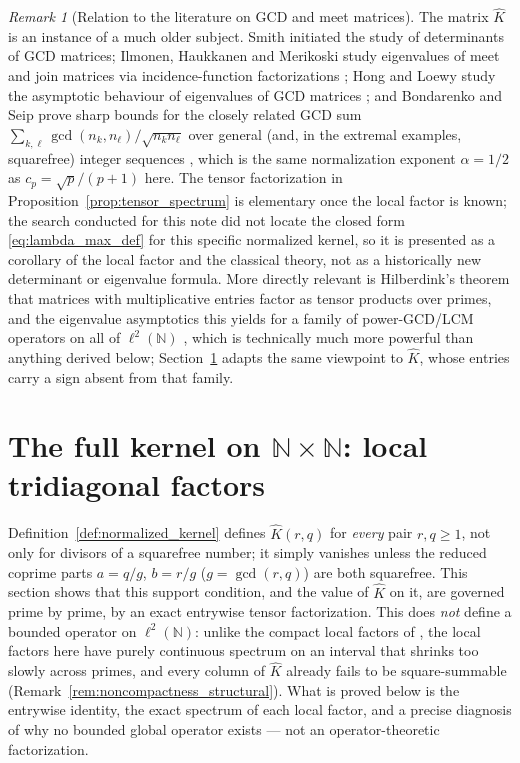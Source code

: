 \documentclass[11pt]{amsart}
\numberwithin{equation}{section}
\theoremstyle{plain}
\theoremstyle{definition}
\theoremstyle{remark}
\newtheorem{remark}[theorem]{Remark}
\newcommand{\N}{\mathbb N}
\begin{document}
\begin{remark}[Relation to the literature on GCD and meet matrices]
\label{rem:gcd_matrix_literature}
The matrix \(\widehat K\) is an instance of a much older subject.  Smith initiated the study of determinants of GCD matrices; Ilmonen, Haukkanen and Merikoski study eigenvalues of meet and join matrices via incidence-function factorizations \cite{IlmonenHaukkanenMerikoski2008}; Hong and Loewy study the asymptotic behaviour of eigenvalues of GCD matrices \cite{HongLoewy2004}; and Bondarenko and Seip prove sharp bounds for the closely related GCD sum \(\sum_{k,\ell}\gcd(n_k,n_\ell)/\sqrt{n_kn_\ell}\) over general (and, in the extremal examples, squarefree) integer sequences \cite{BondarenkoSeip2015}, which is the same normalization exponent \(\alpha=1/2\) as \(c_p=\sqrt p/(p+1)\) here.  The tensor factorization in Proposition~\ref{prop:tensor_spectrum} is elementary once the local factor is known; the search conducted for this note did not locate the closed form \eqref{eq:lambda_max_def} for this specific normalized kernel, so it is presented as a corollary of the local factor and the classical theory, not as a historically new determinant or eigenvalue formula.  More directly relevant is Hilberdink's theorem that matrices with multiplicative entries factor as tensor products over primes, and the eigenvalue asymptotics this yields for a family of power-GCD/LCM operators on all of \(\ell^2(\N)\) \cite{HilberdinkPushnitski2021}, which is technically much more powerful than anything derived below; Section~\ref{sec:full_tensor} adapts the same viewpoint to \(\widehat K\), whose entries carry a sign absent from that family.
\end{remark}

\section{The full kernel on \texorpdfstring{$\N\times\N$}{N x N}: local tridiagonal factors}
\label{sec:full_tensor}

Definition~\ref{def:normalized_kernel} defines \(\widehat K(r,q)\) for \emph{every} pair \(r,q\ge1\), not only for divisors of a squarefree number; it simply vanishes unless the reduced coprime parts \(a=q/g\), \(b=r/g\) (\(g=\gcd(r,q)\)) are both squarefree.  This section shows that this support condition, and the value of \(\widehat K\) on it, are governed prime by prime, by an exact entrywise tensor factorization.  This does \emph{not} define a bounded operator on \(\ell^2(\N)\): unlike the compact local factors of \cite{HilberdinkPushnitski2021}, the local factors here have purely continuous spectrum on an interval that shrinks too slowly across primes, and every column of \(\widehat K\) already fails to be square-summable (Remark~\ref{rem:noncompactness_structural}).  What is proved below is the entrywise identity, the exact spectrum of each local factor, and a precise diagnosis of why no bounded global operator exists — not an operator-theoretic factorization.
\end{document}
